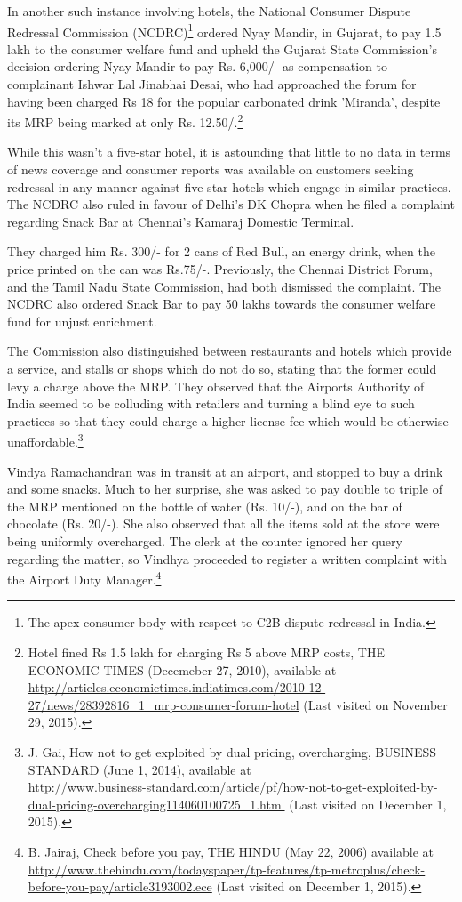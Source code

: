 \begin{multicols}{2}
\noi
In another such instance involving hotels, the National Consumer Dispute Redressal
Commission (NCDRC)\footnote{The apex consumer body with respect to C2B dispute redressal in India.} ordered Nyay Mandir, in Gujarat, to pay 1.5 lakh to the consumer
welfare fund and upheld the Gujarat State Commission's decision ordering Nyay Mandir to pay
Rs. 6,000/- as compensation to complainant Ishwar Lal Jinabhai Desai, who had approached the forum for having been charged Rs 18 for the popular carbonated drink 'Miranda', despite
its MRP being marked at only Rs. 12.50/.\footnote{Hotel fined Rs 1.5 lakh for charging Rs 5 above MRP costs, THE ECONOMIC TIMES (Decemeber 27, 2010), available at\\ \url{http://articles.economictimes.indiatimes.com/2010-12-27/news/28392816_1_mrp-consumer-forum-hotel} (Last visited on November 29, 2015).}

\noi
While this wasn’t a five-star hotel, it is astounding that little to no data in terms of news
coverage and consumer reports was available on customers seeking redressal in any manner
against five star hotels which engage in similar practices. The NCDRC also ruled in favour of
Delhi’s DK Chopra when he filed a complaint regarding Snack Bar at Chennai’s Kamaraj
Domestic Terminal.

\noi
They charged him Rs. 300/- for 2 cans of Red Bull, an energy drink, when the price printed on
the can was Rs.75/-. Previously, the Chennai District Forum, and the Tamil Nadu State
Commission, had both dismissed the complaint. The NCDRC also ordered Snack Bar to pay
50 lakhs towards the consumer welfare fund for unjust enrichment.

\noi
The Commission also distinguished between restaurants and hotels which provide a service,
and stalls or shops which do not do so, stating that the former could levy a charge above the
MRP. They observed that the Airports Authority of India seemed to be colluding with retailers
and turning a blind eye to such practices so that they could charge a higher license fee which
would be otherwise unaffordable.\footnote{J. Gai, How not to get exploited by dual pricing, overcharging, BUSINESS STANDARD (June 1, 2014), available at\\ \url{http://www.business-standard.com/article/pf/how-not-to-get-exploited-by-dual-pricing-overcharging114060100725_1.html} (Last visited on December 1, 2015).}

\noi
Vindya Ramachandran was in transit at an airport, and stopped to buy a drink and some snacks.
Much to her surprise, she was asked to pay double to triple of the MRP mentioned on the bottle
of water (Rs. 10/-), and on the bar of chocolate (Rs. 20/-). She also observed that all the items
sold at the store were being uniformly overcharged. The clerk at the counter ignored her query
regarding the matter, so Vindhya proceeded to register a written complaint with the Airport
Duty Manager.\footnote{B. Jairaj, Check before you pay, THE HINDU (May 22, 2006) available at \url{http://www.thehindu.com/todayspaper/tp-features/tp-metroplus/check-before-you-pay/article3193002.ece} (Last visited on December 1, 2015).}


\end{multicols}

